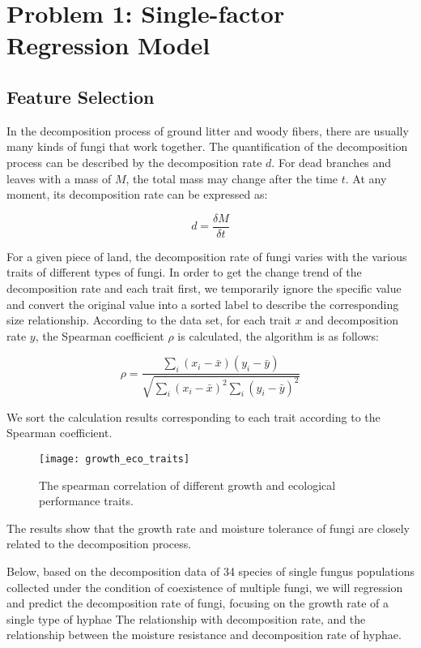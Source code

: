 \documentclass{mcmthesis}
\begin{document}
\section{Problem 1: Single-factor Regression Model}

\subsection{Feature Selection}

In the decomposition process of ground litter and woody fibers, there are usually many kinds of fungi that work together. The quantification of the decomposition process can be described by the decomposition rate $ d $. For dead branches and leaves with a mass of $ M $, the total mass may change after the time $ t $. At any moment, its decomposition rate can be expressed as: 

\begin{equation}
  d=\frac{\delta M}{\delta t}
\end{equation}

For a given piece of land, the decomposition rate of fungi varies with the various traits of different types of fungi. In order to get the change trend of the decomposition rate and each trait first, we temporarily ignore the specific value and convert the original value into a sorted label to describe the corresponding size relationship. According to the data set, for each trait $ x $ and decomposition rate $ y $, the Spearman coefficient $ \rho $ is calculated, the algorithm is as follows: 

\begin{equation}
  \rho=\frac{\sum_{i}\left(x_{i}-\bar{x}\right)\left(y_{i}-\bar{y}\right)}{\sqrt{\sum_{i}\left(x_{i}-\bar{x}\right)^{2} \sum_{i}\left(y_{i}-\bar{y}\right)^{2}}}
\end{equation}

We sort the calculation results corresponding to each trait according to the Spearman coefficient. 

\begin{figure}[H]
  \small
  \centering
  \texttt{[image: growth\_eco\_traits]}
  \caption{The spearman correlation of different growth and ecological performance traits.}
  \label{growth_eco_traits}
\end{figure}

The results show that the growth rate and moisture tolerance of fungi are closely related to the decomposition process. 

Below, based on the decomposition data of 34 species of single fungus populations collected under the condition of coexistence of multiple fungi, we will regression and predict the decomposition rate of fungi, focusing on the growth rate of a single type of hyphae The relationship with decomposition rate, and the relationship between the moisture resistance and decomposition rate of hyphae. 
\end{document}
